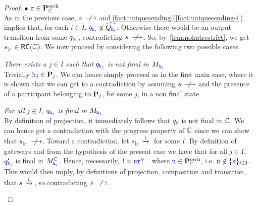 \begin{proof}
$\bullet$ $\ttr\in\rolesorch_{\cs}$.\\
As in the previous case, $s\notlts{}$  and \cref{fact:uniquesending}(\ref{fact:uniquesending-i})
implies that, for each $i\in I$, $q_{\HH_i}\not\in\widehat{Q_{\HH_i}}$. Otherwise
there would be an output transition from some $q_{\HH_i}$, contradicting $s\notlts{}$.
So, by~\cref{lem:nohatrestrict}, we get $\restrict{s}{\cs}\in \RS(\cs)$.
We now proceed by considering the following two possible cases.
\begin{description}
\item
{\em There exists a $j\in I$ such that $q_{\hh_j}$ is not final in $M_{\hh_j}$}\\
Trivially $\hh_j\in\roles_j$. We can hence simply proceed as in the first main case, where it is shown that we can get to a contradiction by assuming $s\notlts{}$ and the 
presence of a participant belonging to $\roles_j$, for some $j$, in a non final state.  
 \item
{\em For all $j\in I$, $q_{\hh_j}$ is final in $M_{\hh_j}$}\\
By definition of projection, it immediately follows that $q_{\ttr}$ is not final in $\cs$.
We can hence get a contradiction with the progress property of $\cs$ since we can show that
$\restrict{s}{\cs}\notlts{}$. Toward a contradiction, let
$\restrict{s}{\cs}\lts{\elle}$ for some $\elle$. 
By definition of gateways and from the hypothesis of the present case 
we have that for all $j\in I$, $\dot{q_{\kk_j}}$ is final in $M^{\cs}_{\kk_j}$.
Hence, necessarily, $\elle=\ttu\ttr?\_$ where $\ttu\in\rolesorch_{\cs}$, i.e. 
$\ttu\not\in\Set{\kk}_{i\in I}$. 
This would then imply,  by definitions of projection, composition and transition,  that
$s\lts{\elle}$, so contradicting $s\notlts{}$.
\end{description}

\end{proof}









